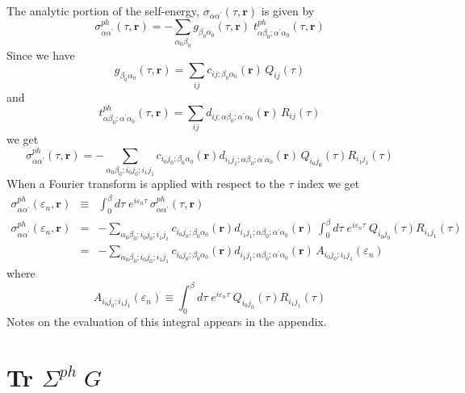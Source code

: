 The analytic portion of the self-energy, 
$\sigma_{\alpha\alpha^{\prime}}(\tau,\mathbf{r})$ is given
by
\begin{equation}
\sigma^{ph}_{\alpha\alpha^{\prime}}(\tau,\mathbf{r}) =
- \sum_{\alpha_0 \beta_0}
g_{\beta_0 \alpha_0}(\tau,\mathbf{r})\; 
t^{ph}_{\alpha \beta_0;\alpha^{\prime} \alpha_0}(\tau,\mathbf{r})
\end{equation}
Since we have
\begin{equation}
g_{\beta_0 \alpha_0}(\tau,\mathbf{r}) =
\sum_{ij} c_{ij; \beta_0 \alpha_0}(\mathbf{r})\, Q_{ij}(\tau)
\end{equation}
and
\begin{equation}
t^{ph}_{\alpha \beta_0; \alpha^{\prime}\alpha_0}(\tau,\mathbf{r})
= \sum_{ij} 
d_{ij;\alpha \beta_0; \alpha^{\prime}\alpha_0}(\mathbf{r})\,
R_{ij}(\tau)
\end{equation}
we get
\begin{equation}
\sigma^{ph}_{\alpha\alpha^{\prime}}(\tau,\mathbf{r}) =
- \sum_{\alpha_0 \beta_0; i_0 j_0; i_1 j_1}
 c_{i_0 j_0; \beta_0 \alpha_0}(\mathbf{r}) 
d_{i_1 j_1;\alpha \beta_0; \alpha^{\prime}\alpha_0}(\mathbf{r})\,
Q_{i_0 j_0}(\tau)
R_{i_1 j_1}(\tau)
\end{equation}
When a Fourier transform is applied with respect to the
$\tau$ index we get
\begin{eqnarray}
\sigma^{ph}_{\alpha\alpha^{\prime}}(\varepsilon_n,\mathbf{r})
& \equiv & \int_0^{\beta} d\tau \; e^{i \varepsilon_n \tau}\,
\sigma^{ph}_{\alpha\alpha^{\prime}}(\tau,\mathbf{r})
\\
\sigma^{ph}_{\alpha\alpha^{\prime}}(\varepsilon_n,\mathbf{r}) & = &
- \sum_{\alpha_0 \beta_0; i_0 j_0; i_1 j_1}
 c_{i_0 j_0; \beta_0 \alpha_0}(\mathbf{r}) 
d_{i_1 j_1;\alpha \beta_0; \alpha^{\prime}\alpha_0}(\mathbf{r})\
\int_0^{\beta} d\tau \; e^{i \varepsilon_n \tau}\
Q_{i_0 j_0}(\tau)
R_{i_1 j_1}(\tau)
\\
& = & - \sum_{\alpha_0 \beta_0; i_0 j_0; i_1 j_1}
 c_{i_0 j_0; \beta_0 \alpha_0}(\mathbf{r}) 
d_{i_1 j_1;\alpha \beta_0; \alpha^{\prime}\alpha_0}(\mathbf{r})\,
A_{i_0 j_0; i_1 j_1}(\varepsilon_n)
\end{eqnarray}
where
\begin{equation}
A_{i_0 j_0; i_1 j_1}(\varepsilon_n) \equiv \int_0^{\beta} d\tau \; e^{i \varepsilon_n \tau}\
Q_{i_0 j_0}(\tau)
R_{i_1 j_1}(\tau)
\end{equation}
Notes on the evaluation of this integral appears in the appendix.

\section{Tr $\Sigma^{ph} \; G$}

